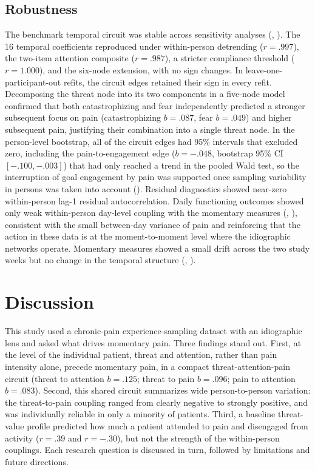 \documentclass[11pt,a4paper]{article}
\begin{document}


\subsection{Robustness}
The benchmark temporal circuit was stable across sensitivity analyses (,
). The 16 temporal coefficients reproduced under within-person detrending
($r=.997$), the two-item attention composite ($r=.987$), a stricter compliance threshold
($r=1.000$), and the six-node extension, with no sign changes. In leave-one-participant-out
refits, the circuit edges retained their sign in every refit. Decomposing the threat node into its
two components in a five-node model confirmed that both catastrophizing and fear independently
predicted a stronger subsequent focus on pain (catastrophizing $b=.087$, fear $b=.049$) and higher
subsequent pain, justifying their combination into a single threat node. In the person-level
bootstrap, all of the circuit edges had 95\% intervals that excluded zero, including the
pain-to-engagement edge
($b=-.048$, bootstrap 95\% CI $[-.100, -.003]$) that had only reached a trend in the pooled Wald
test, so the interruption of goal engagement by pain was supported once sampling variability in
persons was taken into account (). Residual diagnostics showed near-zero
within-person lag-1 residual autocorrelation. Daily functioning outcomes showed only weak within-person day-level coupling
with the momentary measures (, ), consistent with
the small between-day variance of pain and reinforcing that the action in these data is at the
moment-to-moment level where the idiographic networks operate. Momentary measures showed a small
drift across the two study weeks but no change in the temporal structure (,
).

\section{Discussion}
This study used a chronic-pain experience-sampling dataset with an idiographic lens and asked what
drives momentary pain. Three findings stand out. First, at the level of the individual
patient, threat and attention, rather than pain intensity alone, precede momentary pain, in a
compact threat-attention-pain circuit (threat to attention $b=.125$; threat to pain $b=.096$; pain
to attention $b=.083$). Second, this shared circuit summarizes wide person-to-person variation:
the threat-to-pain coupling ranged from clearly negative to strongly positive, and was
individually reliable in only a minority of patients. Third, a baseline threat-value profile
predicted how much a patient attended to pain and disengaged from activity ($r=.39$ and $r=-.30$),
but not the strength of the within-person couplings. Each research question is discussed in turn,
followed by limitations and future directions.
\end{document}
